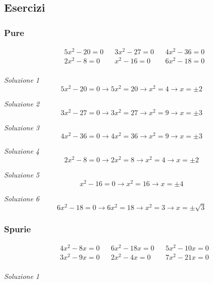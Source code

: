 \subsection{Esercizi}

\subsubsection{Pure}
\begin{align*}
	 & 5x^2 - 20 = 0 &  & 3x^2 - 27 = 0 &  & 4x^2 - 36 = 0 \\
	 & 2x^2 - 8 = 0  &  & x^2 - 16 = 0  &  & 6x^2 - 18 = 0 \\
\end{align*}

\textit{Soluzione 1}\vskip3mm
\[
	5x^2 - 20 = 0 \rightarrow 5x^2 = 20 \rightarrow x^2 = 4 \rightarrow x = \pm 2
\]

\textit{Soluzione 2}\vskip3mm
\[
	3x^2 - 27 = 0 \rightarrow 3x^2 = 27 \rightarrow x^2 = 9 \rightarrow x = \pm 3
\]

\textit{Soluzione 3}\vskip3mm
\[
	4x^2 - 36 = 0 \rightarrow 4x^2 = 36 \rightarrow x^2 = 9 \rightarrow x = \pm 3
\]

\textit{Soluzione 4}\vskip3mm
\[
	2x^2 - 8 = 0 \rightarrow 2x^2 = 8 \rightarrow x^2 = 4 \rightarrow x = \pm 2
\]

\textit{Soluzione 5}\vskip3mm
\[
	x^2 - 16 = 0 \rightarrow x^2 = 16 \rightarrow x = \pm 4
\]

\textit{Soluzione 6}\vskip3mm
\[
	6x^2 - 18 = 0 \rightarrow 6x^2 = 18 \rightarrow x^2 = 3 \rightarrow x = \pm \sqrt{3}
\]

\subsubsection{Spurie}
\begin{align*}
	 & 4x^2 - 8x = 0 &  & 6x^2 - 18x = 0 &  & 5x^2 - 10x = 0 \\
	 & 3x^2 - 9x = 0 &  & 2x^2 - 4x = 0  &  & 7x^2 - 21x = 0 \\
\end{align*}


\textit{Soluzione 1}
\vskip3mm

\begin{center}
\end{center}

